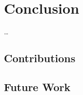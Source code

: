 \documentclass[../thesis.tex]{subfiles}
\begin{document}
\chapter{Conclusion}
\ldots
\section{Contributions}
\lipsum[21]
\section{Future Work}
\lipsum[22]
\end{document}
